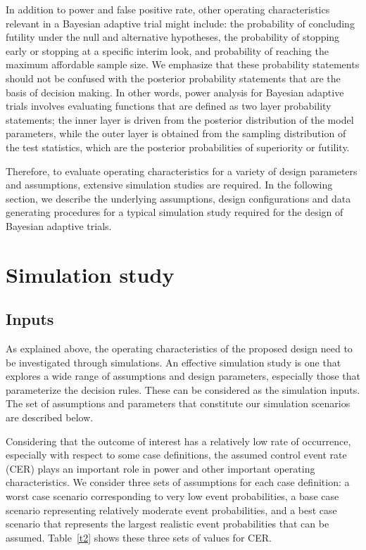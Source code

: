 \documentclass[12pt]{article}
\begin{document}
In addition to power and false positive rate, other operating characteristics relevant in a Bayesian adaptive trial might include: the probability of concluding futility under the null and alternative hypotheses, the probability of stopping early or stopping at a specific interim look, and probability of reaching the maximum affordable sample size. We emphasize that these probability statements should not be confused with the posterior probability statements that are the basis of decision making. In other words, power analysis for Bayesian adaptive trials involves evaluating functions that are defined as two layer probability statements; the inner layer is driven from the posterior distribution of the model parameters, while the outer layer is obtained from the sampling distribution of the test statistics, which are the posterior probabilities of superiority or futility. 

Therefore, to evaluate operating characteristics for a variety of design parameters and assumptions, extensive simulation studies are required. In the following section, we describe the underlying assumptions, design configurations and data generating procedures for a typical simulation study required for the design of Bayesian adaptive trials.


\section{Simulation study}\label{Sec:sims}

\subsection{Inputs}

As explained above, the operating characteristics of the proposed design need to be investigated through simulations. An effective simulation study is one that explores a wide range of assumptions and design parameters, especially those that parameterize the decision rules. These can be considered as the simulation inputs. The set of assumptions and parameters that constitute our simulation scenarios are described below.

Considering that the outcome of interest has a relatively low rate of occurrence, especially with respect to some case definitions, the assumed control event rate (CER) plays an important role in power and other important operating characteristics. We consider three sets of assumptions for each case definition: a worst case scenario corresponding to very low event probabilities, a base case scenario representing relatively moderate event probabilities, and a best case scenario that represents the largest realistic event probabilities that can be assumed. Table~\ref{t2} shows these three sets of values for CER.
\end{document}
